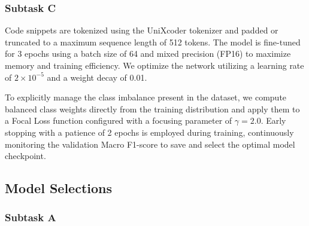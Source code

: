 \documentclass[11pt]{article}
\begin{document}
\subsubsection{ Subtask C}
Code snippets are tokenized using the UniXcoder \cite{guo2022unixcoderunifiedcrossmodalpretraining} tokenizer and padded or truncated to a maximum sequence length of 512 tokens.
The model is fine-tuned for 3 epochs using a batch size of 64 and mixed precision (FP16) to maximize memory and training efficiency.
We optimize the network utilizing a learning rate of $2 \times 10^{-5}$ and a weight decay of 0.01.

To explicitly manage the class imbalance present in the dataset, we compute balanced class weights directly from the training distribution and apply them to a Focal Loss \cite{lin2018focallossdenseobject} function configured with a focusing parameter of $\gamma = 2.0$.
Early stopping with a patience of 2 epochs is employed during training, continuously monitoring the validation Macro F1-score to save and select the optimal model checkpoint.

\subsection{Model Selections}
\subsubsection{ Subtask A} 
\end{document}
